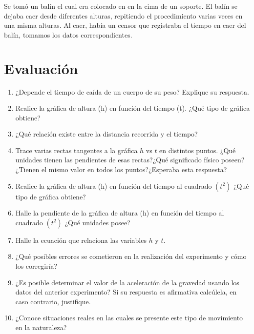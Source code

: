 \documentclass[11pt,twocolumn]{article}
\begin{document}
Se tomó un balín el cual era colocado en en la cima de un soporte. El balín se dejaba caer desde diferentes alturas, repitiendo el procedimiento varias veces en una misma alturas. Al caer, había un censor que registraba el tiempo en caer del balín, tomamos los datos correspondientes. 

\section{Evaluación}

\begin{enumerate}
    \item ¿Depende el tiempo de caída de un cuerpo de su peso? Explique su respuesta.

    \item Realice la gráfica de altura (h) en función del tiempo (t). ¿Qué tipo de gráfica obtiene?

    \item ¿Qué relación existe entre la distancia recorrida y el tiempo?

    \item Trace varias rectas tangentes a la gráfica $h$ vs $t$ en distintos puntos. ¿Qué unidades tienen las pendientes de esas rectas?¿Qué significado físico poseen?¿Tienen el mismo valor en todos los puntos?¿Esperaba esta respuesta?

    \item Realice la gráfica de altura (h) en función del tiempo al cuadrado $\left(t^{2}\right)$ ¿Qué tipo de gráfica obtiene?

    \item Halle la pendiente de la gráfica de altura (h) en función del tiempo al cuadrado $\left(t^{2}\right)$ ¿Qué unidades posee?

    \item Halle la ecuación que relaciona las variables $h$ y $t$.

    \item ¿Qué posibles errores se cometieron en la realización del experimento y cómo los corregiría?

    \item ¿Es posible determinar el valor de la aceleración de la gravedad usando los datos del anterior experimento? Si su respuesta es afirmativa calcúlela, en caso contrario, justifique.

    \item ¿Conoce situaciones reales en las cuales se presente este tipo de movimiento en la naturaleza?

\end{enumerate}
\end{document}
